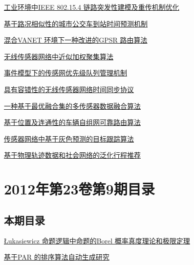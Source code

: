 \documentclass[a4paper]{article}
\begin{document}
\href{http://www.jos.org.cn/ch/reader/download_pdf.aspx?file_no=12009&year_id=2012&quarter_id=zk1&falg=1}{工业环境中IEEE 802.15.4 链路突发性建模及重传机制优化}

\href{http://www.jos.org.cn/ch/reader/download_pdf.aspx?file_no=12010&year_id=2012&quarter_id=zk1&falg=1}{基于路况相似性的城市公交车到站时间预测机制}

\href{http://www.jos.org.cn/ch/reader/download_pdf.aspx?file_no=12011&year_id=2012&quarter_id=zk1&falg=1}{混合VANET 环境下一种改进的GPSR 路由算法}

\href{http://www.jos.org.cn/ch/reader/download_pdf.aspx?file_no=12012&year_id=2012&quarter_id=zk1&falg=1}{无线传感器网络中近似加权聚集算法}

\href{http://www.jos.org.cn/ch/reader/download_pdf.aspx?file_no=12013&year_id=2012&quarter_id=zk1&falg=1}{事件模型下的传感网优先级队列管理机制}

\href{http://www.jos.org.cn/ch/reader/download_pdf.aspx?file_no=12014&year_id=2012&quarter_id=zk1&falg=1}{具有容错性的无线传感器网络时间同步协议}

\href{http://www.jos.org.cn/ch/reader/download_pdf.aspx?file_no=12015&year_id=2012&quarter_id=zk1&falg=1}{一种基于最优融合集的多传感器数据融合算法}

\href{http://www.jos.org.cn/ch/reader/download_pdf.aspx?file_no=12016&year_id=2012&quarter_id=zk1&falg=1}{基于位置及连通性的车辆自组网可靠路由算法}

\href{http://www.jos.org.cn/ch/reader/download_pdf.aspx?file_no=12017&year_id=2012&quarter_id=zk1&falg=1}{传感器网络中基于灰色预测的目标跟踪算法}

\href{http://www.jos.org.cn/ch/reader/download_pdf.aspx?file_no=12018&year_id=2012&quarter_id=zk1&falg=1}{基于物理轨迹数据和社会网络的泛化行程推荐}


\section{\textbf{2012年第23卷第9期目录}}
\subsection{本期目录}
\href{http://www.jos.org.cn/ch/reader/download_pdf.aspx?file_no=4179&year_id=2012&quarter_id=9&falg=1}{Łukasiewicz 命题逻辑中命题的Borel 概率真度理论和极限定理}

\href{http://www.jos.org.cn/ch/reader/download_pdf.aspx?file_no=4164&year_id=2012&quarter_id=9&falg=1}{基于PAR 的排序算法自动生成研究}
\end{document}
